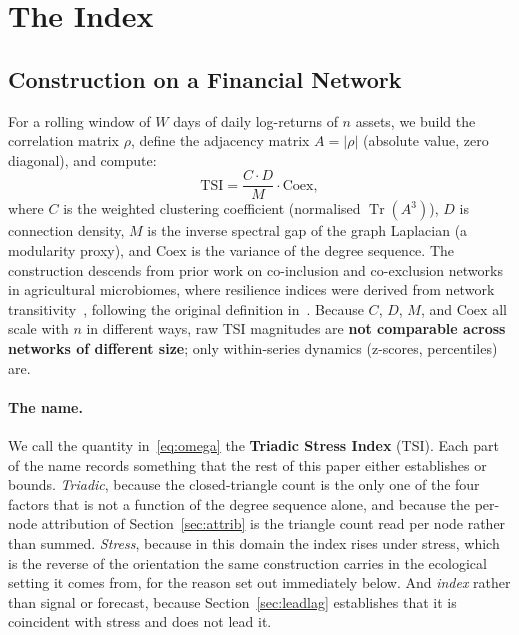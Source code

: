 \documentclass[11pt,a4paper]{article}
\begin{document}
\section{The Index}

\subsection{Construction on a Financial Network}

For a rolling window of $W$ days of daily log-returns of $n$ assets, we
build the correlation matrix $\rho$, define the adjacency matrix
$A = |\rho|$ (absolute value, zero diagonal), and compute:
\begin{equation}
\mathrm{TSI} = \frac{C \cdot D}{M} \cdot \mathrm{Coex},
\label{eq:omega}
\end{equation}
where $C$ is the weighted clustering coefficient (normalised
$\operatorname{Tr}(A^3)$), $D$ is connection density, $M$ is the inverse
spectral gap of the graph Laplacian (a modularity proxy), and
$\mathrm{Coex}$ is the variance of the degree sequence. The construction
descends from prior work on co-inclusion and co-exclusion networks in
agricultural microbiomes, where resilience indices were derived from network
transitivity~\cite{acedo2022indices}, following the
original definition in~\cite{acedo2026fsri}. Because $C$, $D$, $M$, and
$\mathrm{Coex}$ all scale with $n$ in different ways, raw TSI
magnitudes are \textbf{not comparable across networks of different size};
only within-series dynamics (z-scores, percentiles) are.

\paragraph{The name.} We call the quantity in~\eqref{eq:omega} the
\textbf{Triadic Stress Index} (TSI). Each part of the name records something
that the rest of this paper either establishes or bounds. \emph{Triadic},
because the closed-triangle count is the only one of the four factors that is
not a function of the degree sequence alone, and because the per-node
attribution of Section~\ref{sec:attrib} is the triangle count read per node
rather than summed. \emph{Stress}, because in this domain the index rises
under stress, which is the reverse of the orientation the same construction
carries in the ecological setting it comes from, for the reason set out
immediately below. And \emph{index} rather than signal or forecast, because
Section~\ref{sec:leadlag} establishes that it is coincident with stress and
does not lead it.
\end{document}
